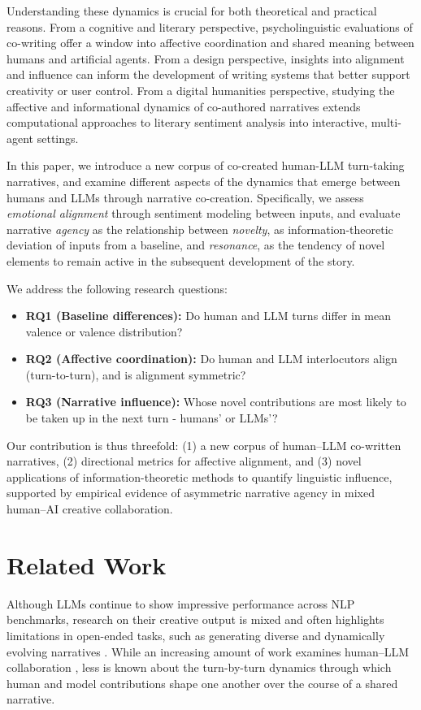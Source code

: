 \documentclass[11pt]{article}
\begin{document}
Understanding these dynamics is crucial for both theoretical and practical reasons. From a cognitive and literary perspective, psycholinguistic evaluations of co-writing offer a window into affective coordination and shared meaning between humans and artificial agents. From a design perspective, insights into alignment and influence can inform the development of writing systems that better support creativity or user control. From a digital humanities perspective, studying the affective and informational dynamics of co-authored narratives extends computational approaches to literary sentiment analysis into interactive, multi-agent settings.

In this paper, we introduce a new corpus of co-created human-LLM turn-taking narratives, and examine different aspects of the dynamics that emerge between humans and LLMs through narrative co-creation. Specifically, we assess \textit{emotional alignment} through sentiment modeling between inputs, and evaluate narrative \textit{agency} as the relationship between \textit{novelty}, as information-theoretic deviation of inputs from a baseline, and \textit{resonance}, as the tendency of novel elements to remain active in the subsequent development of the story.  

We address the following research questions:

\begin{itemize}
    \item \textbf{RQ1 (Baseline differences):} Do human and LLM turns differ in mean valence or valence distribution?
    \item \textbf{RQ2 (Affective coordination):} Do human and LLM interlocutors align (turn-to-turn), and is alignment symmetric?
    \item \textbf{RQ3 (Narrative influence):} Whose novel contributions are most likely to be taken up in the next turn - humans' or LLMs'?
\end{itemize}

Our contribution is thus threefold: (1) a new corpus of human–LLM co-written narratives, (2) directional metrics for affective alignment, and (3) novel applications of information-theoretic methods to quantify linguistic influence, supported by empirical evidence of asymmetric narrative agency in mixed human–AI creative collaboration.

\section{Related Work}
Although LLMs continue to show impressive performance across NLP benchmarks, research on their creative output is mixed and often highlights limitations in open-ended tasks, such as generating diverse and dynamically evolving narratives \cite{tian-etal-2024-large-language}. While an increasing amount of work examines human--LLM collaboration \cite{li2025ai, wan2024felt, tang2025best}, less is known about the turn-by-turn dynamics through which human and model contributions shape one another over the course of a shared narrative. 
\end{document}
